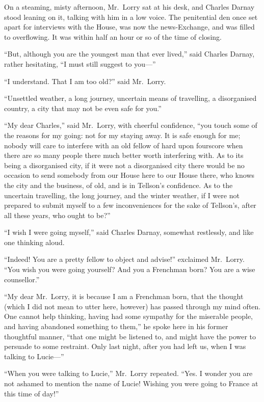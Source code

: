 On a steaming, misty afternoon, Mr.\ Lorry sat at his desk, and Charles
Darnay stood leaning on it, talking with him in a low voice.  The
penitential den once set apart for interviews with the House, was now
the news-Exchange, and was filled to overflowing.  It was within half
an hour or so of the time of closing.

``But, although you are the youngest man that ever lived,'' said Charles
Darnay, rather hesitating, ``I must still suggest to you---''

``I understand.  That I am too old?'' said Mr.\ Lorry.

``Unsettled weather, a long journey, uncertain means of travelling, a
disorganised country, a city that may not be even safe for you.''

``My dear Charles,'' said Mr.\ Lorry, with cheerful confidence, ``you
touch some of the reasons for my going:  not for my staying away.
It is safe enough for me; nobody will care to interfere with an old
fellow of hard upon fourscore when there are so many people there
much better worth interfering with.  As to its being a disorganised
city, if it were not a disorganised city there would be no occasion
to send somebody from our House here to our House there, who knows
the city and the business, of old, and is in Tellson's confidence.
As to the uncertain travelling, the long journey, and the winter
weather, if I were not prepared to submit myself to a few inconveniences
for the sake of Tellson's, after all these years, who ought to be?''

``I wish I were going myself,'' said Charles Darnay, somewhat restlessly,
and like one thinking aloud.

``Indeed!  You are a pretty fellow to object and advise!'' exclaimed
Mr.\ Lorry.  ``You wish you were going yourself?  And you a Frenchman
born?  You are a wise counsellor.''

``My dear Mr.\ Lorry, it is because I am a Frenchman born, that the
thought (which I did not mean to utter here, however) has passed
through my mind often.  One cannot help thinking, having had some
sympathy for the miserable people, and having abandoned something to
them,'' he spoke here in his former thoughtful manner, ``that one might
be listened to, and might have the power to persuade to some restraint.
Only last night, after you had left us, when I was talking to Lucie---''

``When you were talking to Lucie,'' Mr.\ Lorry repeated.  ``Yes.  I wonder
you are not ashamed to mention the name of Lucie!  Wishing you were
going to France at this time of day!''

